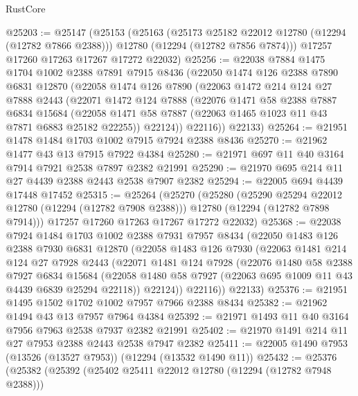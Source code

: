\begin{lexlean}{RustCore}
\begin{coremodule}
@25203 := @25147
    (@25153
      (@25163
        (@25173 @25182 @22012 @12780 (@12294 (@12782 @7866 @2388)))
        @12780
        (@12294 (@12782 @7856 @7874)))
      @17257
      @17260
      @17263
      @17267
      @17272
      @22032)
@25256 := @22038
    @7884
    @1475
    @1704
    @1002
    @2388
    @7891
    @7915
    @8436
    (@22050
      @1474
      @126
      @2388
      @7890
      @6831
      @12870
      (@22058
        @1474
        @126
        @7890
        (@22063
          @1472
          @214
          @124
          @27
          @7888
          @2443
          (@22071
            @1472
            @124
            @7888
            (@22076
              @1471
              @58
              @2388
              @7887
              @6834
              @15684
              (@22058 @1471 @58 @7887 (@22063 @1465 @1023 @11 @43 @7871 @6883 @25182 @22255))
              @22124))
          @22116))
      @22133)
@25264 := @21951 @1478 @1484 @1703 @1002 @7915 @7924 @2388 @8436
@25270 := @21962 @1477 @43 @13 @7915 @7922 @4384
@25280 := @21971 @697 @11 @40 @3164 @7914 @7921 @2538 @7897 @2382 @21991
@25290 := @21970 @695 @214 @11 @27 @4439 @2388 @2443 @2538 @7907 @2382
@25294 := @22005 @694 @4439 @17448 @17452
@25315 := @25264
    (@25270
      (@25280
        (@25290 @25294 @22012 @12780 (@12294 (@12782 @7908 @2388)))
        @12780
        (@12294 (@12782 @7898 @7914)))
      @17257
      @17260
      @17263
      @17267
      @17272
      @22032)
@25368 := @22038
    @7924
    @1484
    @1703
    @1002
    @2388
    @7931
    @7957
    @8434
    (@22050
      @1483
      @126
      @2388
      @7930
      @6831
      @12870
      (@22058
        @1483
        @126
        @7930
        (@22063
          @1481
          @214
          @124
          @27
          @7928
          @2443
          (@22071
            @1481
            @124
            @7928
            (@22076
              @1480
              @58
              @2388
              @7927
              @6834
              @15684
              (@22058 @1480 @58 @7927 (@22063 @695 @1009 @11 @43 @4439 @6839 @25294 @22118))
              @22124))
          @22116))
      @22133)
@25376 := @21951 @1495 @1502 @1702 @1002 @7957 @7966 @2388 @8434
@25382 := @21962 @1494 @43 @13 @7957 @7964 @4384
@25392 := @21971 @1493 @11 @40 @3164 @7956 @7963 @2538 @7937 @2382 @21991
@25402 := @21970 @1491 @214 @11 @27 @7953 @2388 @2443 @2538 @7947 @2382
@25411 := @22005 @1490 @7953 (@13526 (@13527 @7953)) (@12294 (@13532 @1490 @11))
@25432 := @25376
    (@25382
      (@25392
        (@25402 @25411 @22012 @12780 (@12294 (@12782 @7948 @2388)))

\end{coremodule}
\end{lexlean}
